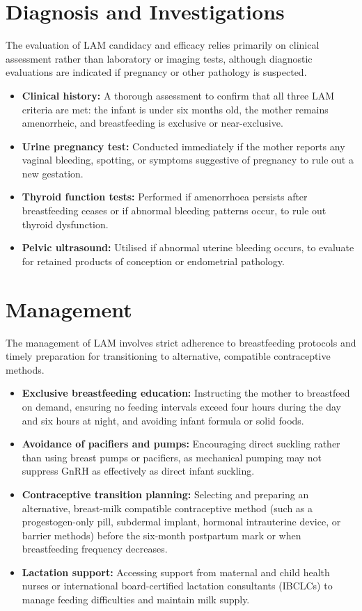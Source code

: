 \section*{Diagnosis and Investigations}
The evaluation of LAM candidacy and efficacy relies primarily on clinical assessment rather than laboratory or imaging tests, although diagnostic evaluations are indicated if pregnancy or other pathology is suspected.
\begin{itemize}
    \item \textbf{Clinical history:} A thorough assessment to confirm that all three LAM criteria are met: the infant is under six months old, the mother remains amenorrheic, and breastfeeding is exclusive or near-exclusive.
    \item \textbf{Urine pregnancy test:} Conducted immediately if the mother reports any vaginal bleeding, spotting, or symptoms suggestive of pregnancy to rule out a new gestation.
    \item \textbf{Thyroid function tests:} Performed if amenorrhoea persists after breastfeeding ceases or if abnormal bleeding patterns occur, to rule out thyroid dysfunction.
    \item \textbf{Pelvic ultrasound:} Utilised if abnormal uterine bleeding occurs, to evaluate for retained products of conception or endometrial pathology.
\end{itemize}

\section*{Management}
The management of LAM involves strict adherence to breastfeeding protocols and timely preparation for transitioning to alternative, compatible contraceptive methods.
\begin{itemize}
    \item \textbf{Exclusive breastfeeding education:} Instructing the mother to breastfeed on demand, ensuring no feeding intervals exceed four hours during the day and six hours at night, and avoiding infant formula or solid foods.
    \item \textbf{Avoidance of pacifiers and pumps:} Encouraging direct suckling rather than using breast pumps or pacifiers, as mechanical pumping may not suppress GnRH as effectively as direct infant suckling.
    \item \textbf{Contraceptive transition planning:} Selecting and preparing an alternative, breast-milk compatible contraceptive method (such as a progestogen-only pill, subdermal implant, hormonal intrauterine device, or barrier methods) before the six-month postpartum mark or when breastfeeding frequency decreases.
    \item \textbf{Lactation support:} Accessing support from maternal and child health nurses or international board-certified lactation consultants (IBCLCs) to manage feeding difficulties and maintain milk supply.
\end{itemize}

